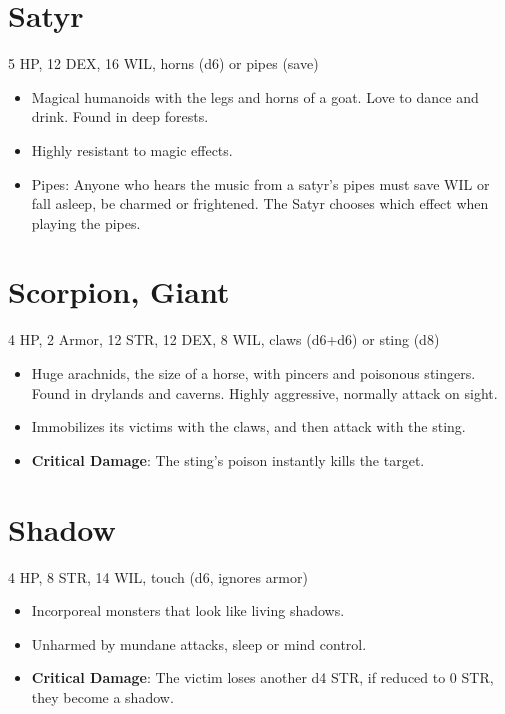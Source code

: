 \documentclass[
  10pt,
  american,
]{article}
\begin{document}
\hypertarget{satyr}{%
\section{Satyr}\label{satyr}}

5 HP, 12 DEX, 16 WIL, horns (d6) or pipes (save)

\begin{samepage}
\begin{itemize}
\setlength\itemsep{-.5em}
\item Magical humanoids with the legs and horns of a goat. Love to dance and drink. Found in deep forests.
\item Highly resistant to magic effects.
\item Pipes: Anyone who hears the music from a satyr's pipes must save WIL or fall asleep, be charmed or frightened. The Satyr chooses which effect when playing the pipes.
\end{itemize}
\end{samepage}

\hypertarget{scorpion-giant}{%
\section{Scorpion, Giant}\label{scorpion-giant}}

4 HP, 2 Armor, 12 STR, 12 DEX, 8 WIL, claws (d6+d6) or sting (d8)

\begin{samepage}
\begin{itemize}
\setlength\itemsep{-.5em}
\item Huge arachnids, the size of a horse, with pincers and poisonous stingers. Found in drylands and caverns. Highly aggressive, normally attack on sight.
\item Immobilizes its victims with the claws, and then attack with the sting.
\item \textbf{Critical Damage}: The sting's poison instantly kills the target.
\end{itemize}
\end{samepage}

\hypertarget{shadow}{%
\section{Shadow}\label{shadow}}

4 HP, 8 STR, 14 WIL, touch (d6, ignores armor)~

\begin{samepage}
\begin{itemize}
\setlength\itemsep{-.5em}
\item Incorporeal monsters that look like living shadows.
\item Unharmed by mundane attacks, sleep or mind control.
\item \textbf{Critical Damage}: The victim loses another d4 STR, if reduced to 0 STR, they become a shadow.
\end{itemize}
\end{samepage}
\end{document}
